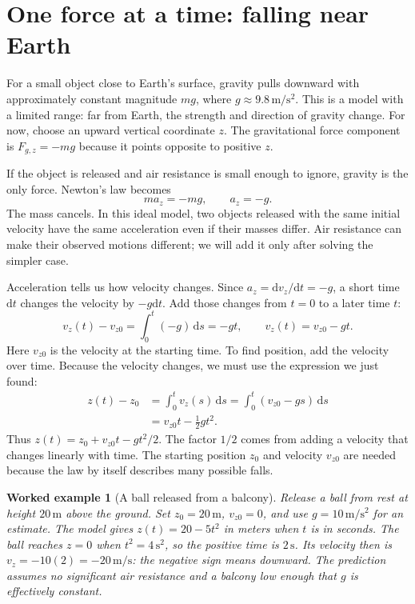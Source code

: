 \documentclass[11pt,oneside]{book}
\newcommand{\dd}{\mathrm{d}}
\theoremstyle{reviewstyle}
\newtheorem{example}{Worked example}[chapter]
\begin{document}
\section{One force at a time: falling near Earth}
For a small object close to Earth's surface, gravity pulls downward with approximately constant magnitude $mg$, where $g\approx9.8\,\mathrm{m/s^2}$. This is a model with a limited range: far from Earth, the strength and direction of gravity change. For now, choose an upward vertical coordinate $z$. The gravitational force component is $F_{g,z}=-mg$ because it points opposite to positive $z$.

If the object is released and air resistance is small enough to ignore, gravity is the only force. Newton's law becomes
\begin{equation}
ma_z=-mg,\qquad a_z=-g.
\end{equation}
The mass cancels. In this ideal model, two objects released with the same initial velocity have the same acceleration even if their masses differ. Air resistance can make their observed motions different; we will add it only after solving the simpler case.

Acceleration tells us how velocity changes. Since $a_z=\dd v_z/\dd t=-g$, a short time $\dd t$ changes the velocity by $-g\dd t$. Add those changes from $t=0$ to a later time $t$:
\begin{equation}
v_z(t)-v_{z0}=\int_0^t(-g)\,\dd s=-gt,
\qquad v_z(t)=v_{z0}-gt.
\end{equation}
Here $v_{z0}$ is the velocity at the starting time. To find position, add the velocity over time. Because the velocity changes, we must use the expression we just found:
\begin{align}
z(t)-z_0
&=\int_0^t v_z(s)\,\dd s
 =\int_0^t(v_{z0}-gs)\,\dd s\\
&=v_{z0}t-\tfrac12gt^2.
\end{align}
Thus $z(t)=z_0+v_{z0}t-gt^2/2$. The factor $1/2$ comes from adding a velocity that changes linearly with time. The starting position $z_0$ and velocity $v_{z0}$ are needed because the law by itself describes many possible falls.

\begin{example}[A ball released from a balcony]
Release a ball from rest at height $20\,\mathrm m$ above the ground. Set $z_0=20\,\mathrm m$, $v_{z0}=0$, and use $g=10\,\mathrm{m/s^2}$ for an estimate. The model gives $z(t)=20-5t^2$ in meters when $t$ is in seconds. The ball reaches $z=0$ when $t^2=4\,\mathrm{s^2}$, so the positive time is $2\,\mathrm s$. Its velocity then is $v_z=-10(2)=-20\,\mathrm{m/s}$: the negative sign means downward. The prediction assumes no significant air resistance and a balcony low enough that $g$ is effectively constant.
\end{example}
\end{document}
